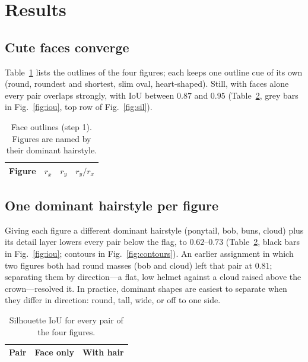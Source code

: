 \documentclass[11pt]{article}
\begin{document}
\section{Results}
\subsection{Cute faces converge}
Table~\ref{tab:outline} lists the outlines of the four figures; each keeps one outline cue of its own (round, roundest and shortest, slim oval, heart-shaped).
Still, with faces alone every pair overlaps strongly, with IoU between $0.87$ and $0.95$ (Table~\ref{tab:four}, grey bars in Fig.~\ref{fig:iou}, top row of Fig.~\ref{fig:sil}).

\begin{table}[htbp]
\centering
\begin{tabular}{lccc}
\toprule
Figure & $r_x$ & $r_y$ & $r_y/r_x$ \\
\midrule

\bottomrule
\end{tabular}
\caption{Face outlines (step 1). Figures are named by their dominant hairstyle.}
\label{tab:outline}
\end{table}

\subsection{One dominant hairstyle per figure}
Giving each figure a different dominant hairstyle (ponytail, bob, buns, cloud) plus its detail layer lowers every pair below the flag, to $0.62$--$0.73$ (Table~\ref{tab:four}, black bars in Fig.~\ref{fig:iou}; contours in Fig.~\ref{fig:contours}).
An earlier assignment in which two figures both had round masses (bob and cloud) left that pair at $0.81$; separating them by direction---a flat, low helmet against a cloud raised above the crown---resolved it.
In practice, dominant shapes are easiest to separate when they differ in direction: round, tall, wide, or off to one side.

\begin{table}[htbp]
\centering
\begin{tabular}{llcc}
\toprule
\multicolumn{2}{c}{Pair} & Face only & With hair \\
\midrule

\bottomrule
\end{tabular}
\caption{Silhouette IoU for every pair of the four figures.}
\label{tab:four}
\end{table}
\end{document}

